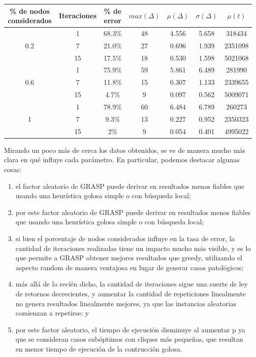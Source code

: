 \begin{center}
    \begin{tabular}{ | c | c | c | c | c | c | c |}
        \hline
        \% de nodos considerados & Iteraciones & \% de error & $max(\Delta)$ & $\mu(\Delta)$ & $\sigma(\Delta)$ & $\mu(t)$ \\ \hline
            &  1 & 68.3\% & 48 & 4.556 & 5.658 &  318434 \\ \cline{2-7}
        0.2 &  7 & 21.0\% & 27 & 0.696 & 1.939 & 2351098 \\ \cline{2-7}
            & 15 & 17.5\% & 18 & 0.530 & 1.598 & 5021068 \\ \hline
            &  1 & 75.9\% & 59 & 5.861 & 6.489 &  281990 \\ \cline{2-7}
        0.6 &  7 & 11.8\% & 15 & 0.307 & 1.133 & 2339655 \\ \cline{2-7}
            & 15 &  4.7\% &  9 & 0.097 & 0.562 & 5009071 \\ \hline
            &  1 & 78.9\% & 60 & 6.484 & 6.789 &  260273 \\ \cline{2-7}
          1 &  7 &  9.3\% & 13 & 0.227 & 0.952 & 2350323 \\ \cline{2-7}
            & 15 &    2\% &  9 & 0.054 & 0.401 & 4995022 \\
        \hline
    \end{tabular}
\end{center}

Mirando un poco más de cerca los datos obtenidos, se ve de manera mucho más clara en qué influye cada parámetro. En particular, podemos destacar algunas cosas:

\begin{enumerate}
    \item el factor aleatorio de GRASP puede derivar en resultados menos fiables que usando una heurística golosa simple o con búsqueda local;
    \item por este factor aleatorio de GRASP puede derivar en resultados menos fiables que usando una heurística golosa simple o con búsqueda local;
	\item si bien el porcentaje de nodos considerados influye en la tasa de error, la cantidad de iteraciones realizadas tiene un impacto mucho más visible, y es lo que permite a GRASP obtener mejores resultados que greedy, utilizando el aspecto random de manera ventajosa en lugar de generar casos patológicos;
    \item más allá de lo recíén dicho, la cantidad de iteraciones sigue una suerte de ley de retornos decrecientes, y aumentar la cantidad de repeticiones linealmente no genera resultados linealmente mejores, ya que las instancias aleatorias comienzan a repetirse; y
    \item por este factor aleatorio, el tiempo de ejecución disminuye al aumentar p ya que se consideran casos subóptimos con cliques más pequeñas, que resultan en menor tiempo de ejecución de la contrucción golosa.
\end{enumerate}


